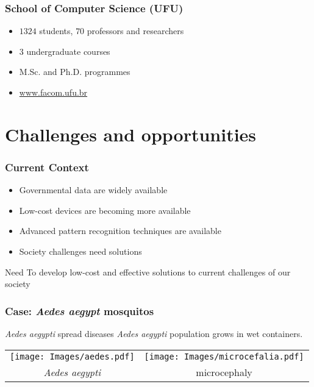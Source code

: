 \documentclass{beamer}
\begin{document}
\begin{frame}\frametitle{School of Computer Science (UFU)}
  \begin{itemize}
    \item $1324$ students, $70$ professors and researchers
    \item $3$ undergraduate courses
    \item M.Sc. and Ph.D. programmes
    \item \href{http://www.portal.facom.ufu.br/en}{www.facom.ufu.br}
  \end{itemize}
\end{frame}

\section{Challenges and opportunities}

\begin{frame}\frametitle{Current Context}
  \begin{itemize}
    \item Governmental data are widely available
    \item Low-cost devices are becoming more available
    \item Advanced pattern recognition techniques are available
    \item Society challenges need solutions
  \end{itemize}
  \begin{alertblock}{Need}
To develop low-cost and effective solutions to current challenges of our society
  \end{alertblock}
\end{frame}


\begin{frame}\frametitle{Case: \textit{Aedes aegypt} mosquitos}

  \begin{alertblock}{\textit{Aedes aegypti} spread diseases}
\textit{Aedes aegypti} population grows in wet containers.
  \end{alertblock}

  \centering
  \begin{tabular}{cc}
    \texttt{[image: Images/aedes.pdf]}& \texttt{[image: Images/microcefalia.pdf]}\\
    \textit{Aedes aegypti} & microcephaly 
  \end{tabular}
\end{frame}
\end{document}
